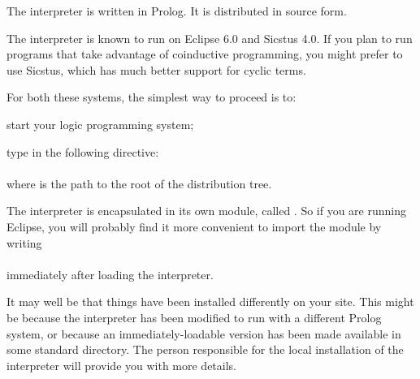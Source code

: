 
The interpreter is written in Prolog.  It is distributed in source
form.%

The interpreter is known to run on Eclipse 6.0 and Sicstus 4.0.  If you plan
to run programs that take advantage of coinductive programming, you might
prefer to use Sicstus, which has much better support for cyclic terms.

For both these systems, the simplest way to proceed is to:
\begin{Enumerate}
\item
  start your logic programming system;
\item
  type in the following directive:\\
  \ind{}\\
  where  is the path to the root of the distribution tree.
\end{Enumerate}

The interpreter is encapsulated in its own module, called .  So if
you are running Eclipse, you will probably find it more convenient to import
the module by writing\\
\ind{}\label{import-dra}\\
immediately after loading the interpreter.

It may well be that things have been installed differently on your site.
This might be because the interpreter has been modified to run with a
different Prolog system, or because an immediately-loadable version has been
made available in some standard directory. The person responsible for the
local installation of the interpreter will provide you with more details.
